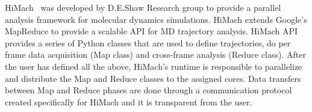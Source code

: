 HiMach~\cite{himach-2008} was developed by D.E.Shaw Research group to provide a parallel analysis
framework for molecular dynamics simulations. HiMach extends Google's MapReduce
to provide a scalable API for MD trajectory analysis. HiMach API provides a series
of Python classes that are used to define trajectories, do per frame data acquisition
(Map class) and cross-frame analysis (Reduce class). After the user has defined all 
the above, HiMach's runtime is responsible to parallelize and distribute the Map and 
Reduce classes to the assigned cores. Data transfers between Map and Reduce phases are
done through a communication protocol created specifically for HiMach and it is transparent
from the user.